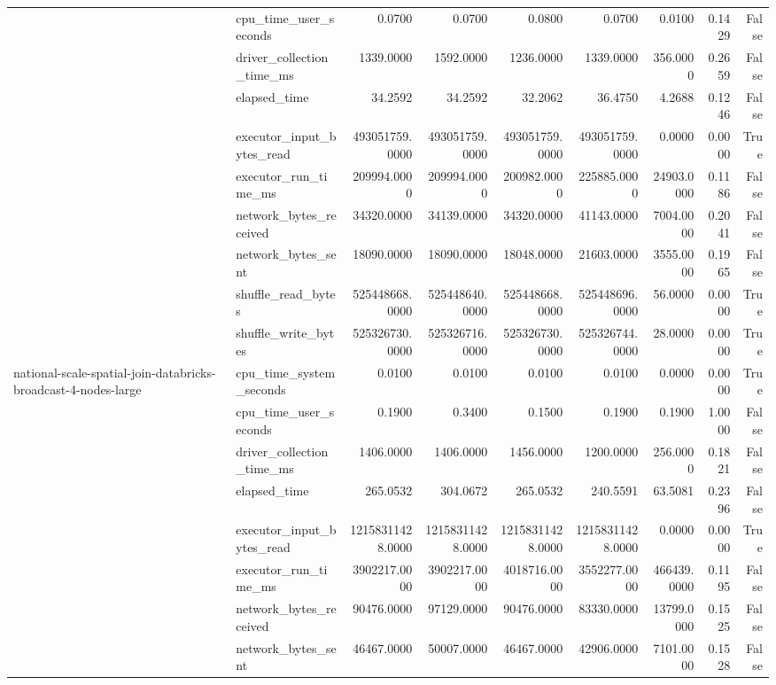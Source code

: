 \begin{tabular}{llrrrrrrr}
 & cpu\_time\_user\_seconds & 0.0700 & 0.0700 & 0.0800 & 0.0700 & 0.0100 & 0.1429 & False \\
 & driver\_collection\_time\_ms & 1339.0000 & 1592.0000 & 1236.0000 & 1339.0000 & 356.0000 & 0.2659 & False \\
 & elapsed\_time & 34.2592 & 34.2592 & 32.2062 & 36.4750 & 4.2688 & 0.1246 & False \\
 & executor\_input\_bytes\_read & 493051759.0000 & 493051759.0000 & 493051759.0000 & 493051759.0000 & 0.0000 & 0.0000 & True \\
 & executor\_run\_time\_ms & 209994.0000 & 209994.0000 & 200982.0000 & 225885.0000 & 24903.0000 & 0.1186 & False \\
 & network\_bytes\_received & 34320.0000 & 34139.0000 & 34320.0000 & 41143.0000 & 7004.0000 & 0.2041 & False \\
 & network\_bytes\_sent & 18090.0000 & 18090.0000 & 18048.0000 & 21603.0000 & 3555.0000 & 0.1965 & False \\
 & shuffle\_read\_bytes & 525448668.0000 & 525448640.0000 & 525448668.0000 & 525448696.0000 & 56.0000 & 0.0000 & True \\
 & shuffle\_write\_bytes & 525326730.0000 & 525326716.0000 & 525326730.0000 & 525326744.0000 & 28.0000 & 0.0000 & True \\
\cline{1-9}
\multirow[t]{10}{*}{national-scale-spatial-join-databricks-broadcast-4-nodes-large} & cpu\_time\_system\_seconds & 0.0100 & 0.0100 & 0.0100 & 0.0100 & 0.0000 & 0.0000 & True \\
 & cpu\_time\_user\_seconds & 0.1900 & 0.3400 & 0.1500 & 0.1900 & 0.1900 & 1.0000 & False \\
 & driver\_collection\_time\_ms & 1406.0000 & 1406.0000 & 1456.0000 & 1200.0000 & 256.0000 & 0.1821 & False \\
 & elapsed\_time & 265.0532 & 304.0672 & 265.0532 & 240.5591 & 63.5081 & 0.2396 & False \\
 & executor\_input\_bytes\_read & 12158311428.0000 & 12158311428.0000 & 12158311428.0000 & 12158311428.0000 & 0.0000 & 0.0000 & True \\
 & executor\_run\_time\_ms & 3902217.0000 & 3902217.0000 & 4018716.0000 & 3552277.0000 & 466439.0000 & 0.1195 & False \\
 & network\_bytes\_received & 90476.0000 & 97129.0000 & 90476.0000 & 83330.0000 & 13799.0000 & 0.1525 & False \\
 & network\_bytes\_sent & 46467.0000 & 50007.0000 & 46467.0000 & 42906.0000 & 7101.0000 & 0.1528 & False \\

\end{tabular}

